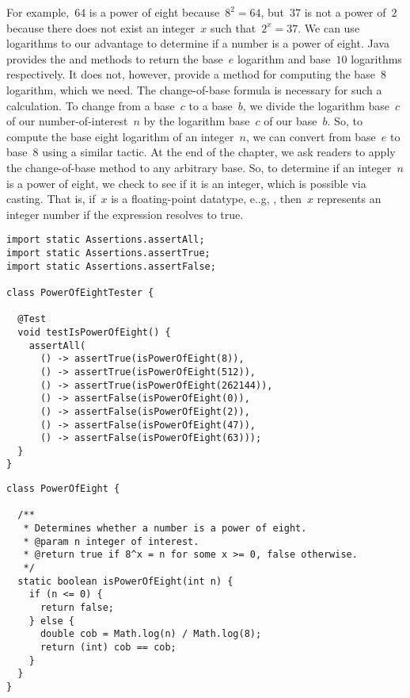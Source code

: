 For example,~$64$ is a power of eight because~$8^2=64$, but~$37$ is not a power of~$2$ because there does not exist an integer~$x$ such that~$2^x=37$.
We can use logarithms to our advantage to determine if a number is a power of eight.
Java provides the  and  methods to return the base~$e$ logarithm and base~$10$ logarithms respectively.
It does not, however, provide a method for computing the base~$8$ logarithm, which we need.
The change-of-base formula is necessary for such a calculation.
To change from a base~$c$ to a base~$b$, we divide the logarithm base~$c$ of our number-of-interest~$n$ by the logarithm base~$c$ of our base~$b$.
So, to compute the base eight logarithm of an integer~$n$, we can convert from base~$e$ to base~$8$ using a similar tactic.
At the end of the chapter, we ask readers to apply the change-of-base method to any arbitrary base.
So, to determine if an integer~$n$ is a power of eight, we check to see if it is an integer, which is possible via casting. 
That is, if~$x$ is a floating-point datatype, e..g, , then~$x$ represents an integer number if the expression  resolves to true.

\begin{lstlisting}[language=MyJava]
import static Assertions.assertAll;
import static Assertions.assertTrue;
import static Assertions.assertFalse;

class PowerOfEightTester {

  @Test
  void testIsPowerOfEight() {
    assertAll(
      () -> assertTrue(isPowerOfEight(8)),
      () -> assertTrue(isPowerOfEight(512)),
      () -> assertTrue(isPowerOfEight(262144)),
      () -> assertFalse(isPowerOfEight(0)),
      () -> assertFalse(isPowerOfEight(2)),
      () -> assertFalse(isPowerOfEight(47)),
      () -> assertFalse(isPowerOfEight(63)));
  }
}
\end{lstlisting}

\begin{lstlisting}[language=MyJava]
class PowerOfEight {

  /**
   * Determines whether a number is a power of eight.
   * @param n integer of interest.
   * @return true if 8^x = n for some x >= 0, false otherwise.
   */
  static boolean isPowerOfEight(int n) {
    if (n <= 0) {
      return false;
    } else {
      double cob = Math.log(n) / Math.log(8);
      return (int) cob == cob;
    }
  }
}
\end{lstlisting}

